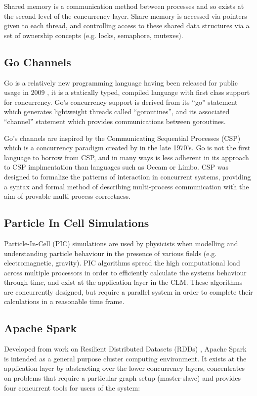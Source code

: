 \documentclass{sig-alternate}
\begin{document}
Shared memory is a communication method between processes and so exists at the second level of the concurrency layer. Share memory is accessed via pointers given to each thread, and controlling access to these shared data structures via a set of ownership concepts (e.g. locks, semaphore, mutexes).

\subsection{Go Channels}
Go is a relatively new programming language having been released for public usage in 2009 \cite{go:_frequen_asked_quest}, it is a statically typed, compiled language with first class support for concurrency. Go's concurrency support is derived from its ``go'' statement which generates lightweight threads called ``goroutines'', and its associated ``channel'' statement which provides communications between goroutines.

Go's channels are inspired by the Communicating Sequential Processes (CSP) which is a concurrency paradigm created by \cite{Hoare:1978:CSP:359576.359585} in the late 1970's. Go is not the first language to borrow from CSP, and in many ways is less adherent in its approach to CSP implmentation than languages such as Occam or Limbo. CSP was designed to formalize the patterns of interaction in concurrent systems, providing a syntax and formal method of describing multi-process communication with the aim of provable multi-process correctness.

\subsection{Particle In Cell Simulations}
Particle-In-Cell (PIC) simulations are used by physicists when modelling and understanding particle behaviour in the presence of various fields (e.g. electromagnetic, gravity). PIC algorithms spread the high computational load across multiple processors in order to efficiently calculate the systems behaviour through time, and exist at the application layer in the CLM. These algorithms are concurrently designed, but require a parallel system in order to complete their calculations in a reasonable time frame. 

\subsection{Apache Spark}
Developed from work on Resilient Distributed Datasets (RDDs)  \cite{zaharia14:_archit_fast_gener_data_proces_large_clust},  Apache Spark is intended as a general purpose cluster computing environment. It exists at the application layer by abstracting over the lower concurrency layers, concentrates on problems that require a particular graph setup (master-slave) and provides four concurrent tools for users of the system:
\end{document}
